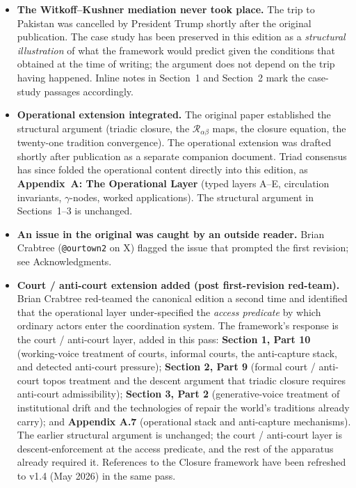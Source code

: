 \documentclass[
]{article}
\providecommand{\tightlist}{%
  \setlength{\itemsep}{0pt}\setlength{\parskip}{0pt}}
\begin{document}
\begin{itemize}
\tightlist
\item
  \textbf{The Witkoff--Kushner mediation never took place.} The trip
  to Pakistan was cancelled by President Trump shortly after the
  original publication. The case study has been preserved in this
  edition as a \emph{structural illustration} of what the framework
  would predict given the conditions that obtained at the time of
  writing; the argument does not depend on the trip having happened.
  Inline notes in Section~1 and Section~2 mark the case-study
  passages accordingly.
\item
  \textbf{Operational extension integrated.} The original paper
  established the structural argument (triadic closure, the
  \(\mathcal{R}_{\alpha\beta}\) maps, the closure equation, the
  twenty-one tradition convergence). The operational extension was
  drafted shortly after publication as a separate companion document.
  Triad consensus has since folded the operational content directly
  into this edition, as \textbf{Appendix~A: The Operational Layer}
  (typed layers A--E, circulation invariants, \(\gamma\)-nodes,
  worked applications). The structural argument in Sections~1--3 is
  unchanged.
\item
  \textbf{An issue in the original was caught by an outside reader.}
  Brian Crabtree (\texttt{@ourtown2} on X) flagged the issue that
  prompted the first revision; see Acknowledgments.
\item
  \textbf{Court / anti-court extension added (post first-revision
  red-team).} Brian Crabtree red-teamed the canonical edition a
  second time and identified that the operational layer
  under-specified the \emph{access predicate} by which ordinary
  actors enter the coordination system. The framework's response is
  the court / anti-court layer, added in this pass: \textbf{Section
  1, Part 10} (working-voice treatment of courts, informal courts,
  the anti-capture stack, and detected anti-court pressure);
  \textbf{Section 2, Part 9} (formal court / anti-court topos
  treatment and the descent argument that triadic closure requires
  anti-court admissibility); \textbf{Section 3, Part 2}
  (generative-voice treatment of institutional drift and the
  technologies of repair the world's traditions already carry); and
  \textbf{Appendix A.7} (operational stack and anti-capture
  mechanisms). The earlier structural argument is unchanged; the
  court / anti-court layer is descent-enforcement at the access
  predicate, and the rest of the apparatus already required it.
  References to the Closure framework have been refreshed to v1.4
  (May 2026) in the same pass.
\end{itemize}
\end{document}
